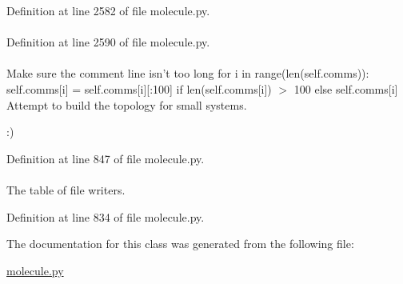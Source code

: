 \-Definition at line 2582 of file molecule.\-py.

\hypertarget{classforcebalance_1_1molecule_1_1Molecule_a4aebc6ada9bda74a6740568d4f3658eb}{
\paragraph[{resname}]{}}\label{classforcebalance_1_1molecule_1_1Molecule_a4aebc6ada9bda74a6740568d4f3658eb}


\-Definition at line 2590 of file molecule.\-py.

\hypertarget{classforcebalance_1_1molecule_1_1Molecule_accabf9159aa7f3c6e514ec048d88eeaa}{
\paragraph[{topology}]{}}\label{classforcebalance_1_1molecule_1_1Molecule_accabf9159aa7f3c6e514ec048d88eeaa}


\-Make sure the comment line isn't too long for i in range(len(self.\-comms))\-: self.\-comms\mbox{[}i\mbox{]} = self.\-comms\mbox{[}i\mbox{]}\mbox{[}\-:100\mbox{]} if len(self.\-comms\mbox{[}i\mbox{]}) $>$ 100 else self.\-comms\mbox{[}i\mbox{]} \-Attempt to build the topology for small systems. 

\-:) 

\-Definition at line 847 of file molecule.\-py.

\hypertarget{classforcebalance_1_1molecule_1_1Molecule_a950a2ec0b5697bf88f192dec676825fc}{
\paragraph[{\-Write\-\_\-\-Tab}]{}}\label{classforcebalance_1_1molecule_1_1Molecule_a950a2ec0b5697bf88f192dec676825fc}


\-The table of file writers. 



\-Definition at line 834 of file molecule.\-py.



\-The documentation for this class was generated from the following file\-:\begin{DoxyCompactItemize}
\item 
\hyperlink{molecule_8py}{molecule.\-py}\end{DoxyCompactItemize}
